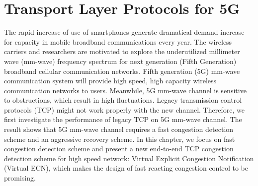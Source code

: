 \chapter{Transport Layer Protocols for 5G}\label{ch:TCP5G} 


\par The rapid increase of use of smartphones generate dramatical demand increase for capacity in mobile broadband communications every year. The wireless carriers and researchers are motivated to explore the underutilized millimeter wave (mm-wave) frequency spectrum for next generation (Fifth Generation) broadband cellular communication networks. Fifth generation (5G) mm-wave communication system will provide high speed, high capacity wireless communication networks to users. Meanwhile, 5G mm-wave channel is sensitive to obstructions, which result in high fluctuations. Legacy transmission control protocols (TCP) might not work properly with the new channel. Therefore, we first investigate the performance of legacy TCP on 5G mm-wave channel. The result shows that 5G mm-wave channel requires a fast congestion detection scheme and an aggressive recovery scheme. In this chapter, we focus on fast congestion detection scheme and present a new end-to-end TCP congestion detection scheme for high speed network: Virtual Explicit Congestion Notification (Virtual ECN), which makes the design of fast reacting congestion control to be promising. 
